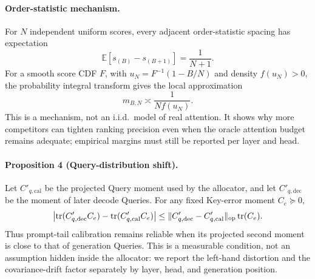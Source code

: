 \paragraph{Order-statistic mechanism.}
For $N$ independent uniform scores, every adjacent order-statistic spacing
has expectation
\begin{equation}
 \mathbb E[s_{(B)}-s_{(B+1)}]=\frac1{N+1}.
 \label{eq:uniform-order-gap}
\end{equation}
For a smooth score CDF $F$, with
$u_N=F^{-1}(1-B/N)$ and density $f(u_N)>0$, the probability integral
transform gives the local approximation
\begin{equation}
 m_{B,N}\asymp\frac1{Nf(u_N)}.
 \label{eq:general-order-gap}
\end{equation}
This is a mechanism, not an i.i.d.\ model of real attention.  It shows why
more competitors can tighten ranking precision even when the oracle
attention budget remains adequate; empirical margins must still be reported
per layer and head.

\paragraph{Proposition 4 (Query-distribution shift).}
Let $C'_{q,\mathrm{cal}}$ be the projected Query moment used by the
allocator, and let $C'_{q,\mathrm{dec}}$ be the moment of later decode
Queries.  For any fixed Key-error moment $C_e\succeq0$,
\begin{equation}
 \left|\operatorname{tr}(C'_{q,\mathrm{dec}}C_e)
       -\operatorname{tr}(C'_{q,\mathrm{cal}}C_e)\right|
 \le
 \|C'_{q,\mathrm{dec}}-C'_{q,\mathrm{cal}}\|_{\mathrm{op}}\operatorname{tr}(C_e).
 \label{eq:query-drift-bound}
\end{equation}
Thus prompt-tail calibration remains reliable when its projected second
moment is close to that of generation Queries.  This is a measurable
condition, not an assumption hidden inside the allocator: we report the
left-hand distortion and the covariance-drift factor separately by layer,
head, and generation position.

